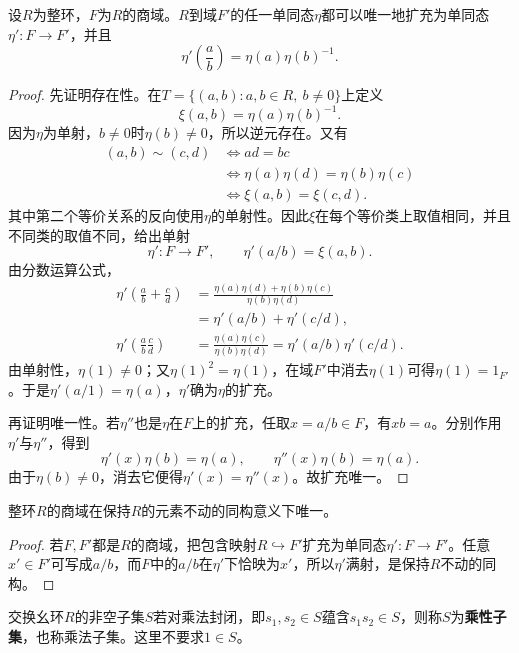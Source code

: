 \begin{theorem}\label{p2:fraction-field-extension}
设$R$为整环，$F$为$R$的商域。$R$到域$F'$的任一单同态$\eta$都可以唯一地扩充为单同态$\eta':F\to F'$，并且
\[
\eta'\left(\frac ab\right)=\eta(a)\eta(b)^{-1}.
\]
\end{theorem}
\begin{proof}
先证明存在性。在$T=\{(a,b):a,b\in R,\ b\ne0\}$上定义
\[
\xi(a,b)=\eta(a)\eta(b)^{-1}.
\]
因为$\eta$为单射，$b\ne0$时$\eta(b)\ne0$，所以逆元存在。又有
\begin{align*}
(a,b)\sim(c,d)
&\Longleftrightarrow ad=bc\\
&\Longleftrightarrow \eta(a)\eta(d)=\eta(b)\eta(c)\\
&\Longleftrightarrow \xi(a,b)=\xi(c,d).
\end{align*}
其中第二个等价关系的反向使用$\eta$的单射性。因此$\xi$在每个等价类上取值相同，并且不同类的取值不同，给出单射
\[
\eta':F\to F',\qquad \eta'(a/b)=\xi(a,b).
\]
由分数运算公式，
\begin{align*}
\eta'\left(\frac ab+\frac cd\right)
&=\frac{\eta(a)\eta(d)+\eta(b)\eta(c)}{\eta(b)\eta(d)}\\
&=\eta'(a/b)+\eta'(c/d),\\
\eta'\left(\frac ab\frac cd\right)
&=\frac{\eta(a)\eta(c)}{\eta(b)\eta(d)}
=\eta'(a/b)\eta'(c/d).
\end{align*}
由单射性，$\eta(1)\ne0$；又$\eta(1)^2=\eta(1)$，在域$F'$中消去$\eta(1)$可得$\eta(1)=1_{F'}$。于是$\eta'(a/1)=\eta(a)$，$\eta'$确为$\eta$的扩充。

再证明唯一性。若$\eta''$也是$\eta$在$F$上的扩充，任取$x=a/b\in F$，有$xb=a$。分别作用$\eta'$与$\eta''$，得到
\[
\eta'(x)\eta(b)=\eta(a),\qquad
\eta''(x)\eta(b)=\eta(a).
\]
由于$\eta(b)\ne0$，消去它便得$\eta'(x)=\eta''(x)$。故扩充唯一。
\end{proof}

\begin{corollary}
整环$R$的商域在保持$R$的元素不动的同构意义下唯一。
\end{corollary}
\begin{proof}
若$F,F'$都是$R$的商域，把包含映射$R\hookrightarrow F'$扩充为单同态$\eta':F\to F'$。任意$x'\in F'$可写成$a/b$，而$F$中的$a/b$在$\eta'$下恰映为$x'$，所以$\eta'$满射，是保持$R$不动的同构。
\end{proof}

\begin{definition}\label{p2:concept:c3-multiplicative-set}
交换幺环$R$的非空子集$S$若对乘法封闭，即$s_1,s_2\in S$蕴含$s_1s_2\in S$，则称$S$为\textbf{乘性子集}，也称乘法子集。这里不要求$1\in S$。
\end{definition}

